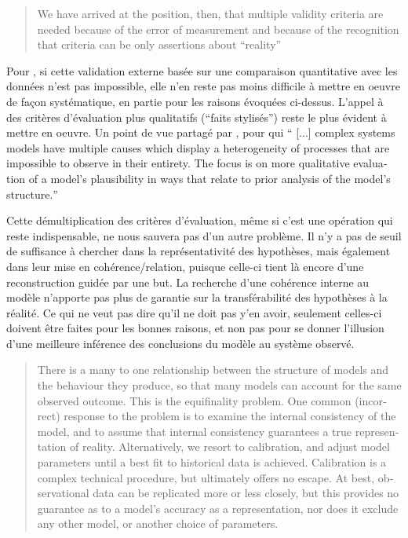 \foreignblockquote{english}[\cite{Hermann1967}]{We have arrived at the position, then, that multiple validity criteria are needed because of the error of measurement and because of the recognition that criteria can be only assertions about \enquote{reality}}


Pour \textcite{Amblard2006}, si cette validation externe basée sur une comparaison quantitative avec les données n'est pas impossible, elle n'en reste pas moins difficile à mettre en oeuvre de façon systématique, en partie pour les raisons évoquées ci-dessus. L'appel à des critères d'évaluation plus qualitatifs (\enquote{faits stylisés}) reste le plus évident à mettre en oeuvre. Un point de vue partagé par \textcite{Batty2001}, pour qui \foreignquote{english}{ [...] complex systems models have multiple causes which display a heterogeneity of processes that are impossible to observe in their entirety. The focus is on more qualitative evaluation of a model’s plausibility in ways that relate to prior analysis of the model’s structure.} 

Cette démultiplication des critères d'évaluation, même si c'est une opération qui reste indispensable, ne nous sauvera pas d'un autre problème. Il n'y a pas de seuil de suffisance à chercher dans la représentativité des hypothèses, mais également dans leur mise en cohérence/relation, puisque celle-ci tient là encore d'une reconstruction guidée par une but. La recherche d'une cohérence interne au modèle n'apporte pas plus de garantie sur la transférabilité des hypothèses à la réalité. Ce qui ne veut pas dire qu'il ne doit pas y'en avoir, seulement celles-ci doivent être faites pour les bonnes raisons, et non pas pour se donner l'illusion d'une meilleure inférence des conclusions du modèle au système observé.

\foreignblockquote{english}[\cite{OSullivan2004}]{There is a many to one relationship between the structure of models and the behaviour they produce, so that many models can account for the same observed outcome. This is the equifinality problem. One common (incorrect) response to the problem is to examine the internal consistency of the model, and to assume that internal consistency guarantees a true representation of reality. Alternatively, we resort to calibration, and adjust model parameters until a best fit to historical data is achieved. Calibration is a complex technical procedure, but ultimately offers no escape. At best, observational data can be replicated more or less closely, but this provides no guarantee as to a model’s accuracy as a representation, nor does it exclude any other model, or another choice of parameters.}

